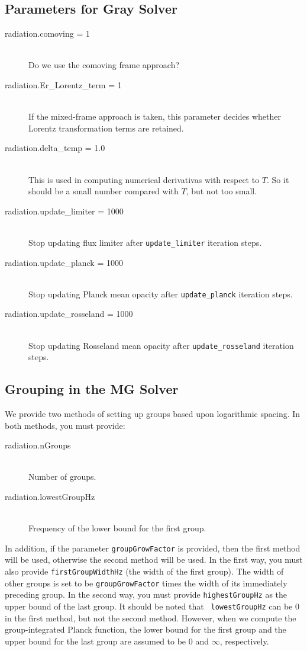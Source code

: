 \documentclass[11pt,letterpaper]{article}
\begin{document}
\subsection{Parameters for Gray Solver}
\label{sec:graypar}

\begin{description}
\item[radiation.comoving = 1] \hfill \\
  Do we use the comoving frame approach?
\item[radiation.Er\_Lorentz\_term = 1] \hfill \\
  If the mixed-frame approach is taken, this parameter decides whether
  Lorentz transformation terms are retained. 
\item[radiation.delta\_temp = 1.0] \hfill \\
  This is used in computing numerical derivativas with respect to $T$.
  So it should be a small number compared with $T$, but not too small.  
\item[radiation.update\_limiter = 1000] \hfill \\
  Stop updating flux limiter after {\tt update\_limiter} iteration steps. 
\item[radiation.update\_planck = 1000] \hfill \\
  Stop updating Planck mean opacity after {\tt update\_planck} iteration steps. 
\item[radiation.update\_rosseland = 1000] \hfill \\
  Stop updating Rosseland mean opacity after {\tt update\_rosseland} iteration steps. 
\end{description}

\subsection{Grouping in the MG Solver}

We provide two methods of setting up groups based upon logarithmic
spacing.  In both methods, you must provide: 
\begin{description}
\item[radiation.nGroups] \hfill \\
  Number of groups. 
\item[radiation.lowestGroupHz] \hfill \\
  Frequency of the lower bound for the first group.
\end{description}

In addition, if the parameter {\tt groupGrowFactor} is provided, then
the first method will be used, otherwise the second method will be
used.  In the first way, you must also provide {\tt firstGroupWidthHz}
(the width of the first group).  The width of other groups is set to
be {\tt groupGrowFactor} times the width of its immediately preceding
group.  In the second way, you must provide {\tt highestGroupHz} as
the upper bound of the last group.  It should be noted that {\tt
  lowestGroupHz} can be 0 in the first method, but not the second
method.  However, when we compute the group-integrated Planck
function, the lower bound for the first group and the upper bound for
the last group are assumed to be 0 and $\infty$, respectively.
\end{document}
